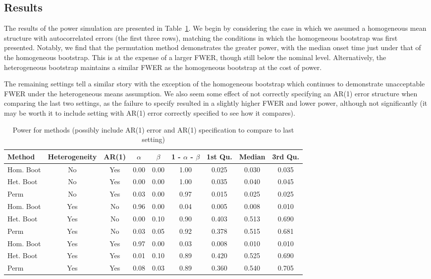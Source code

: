 \documentclass{article}
\begin{document}
\subsection{Results}

The results of the power simulation are presented in Table~\ref{tab:power_methods}. We begin by considering the case in which we assumed a homogeneous mean structure with autocorrelated errors (the first three rows), matching the conditions in which the homogeneous bootstrap was first presented. Notably, we find that the permutation method demonstrates the greater power, with the median onset time just under that of the homogeneous bootstrap. This is at the expense of a larger FWER, though still below the nominal level. Alternatively, the heterogeneous bootstrap maintains a similar FWER as the homogeneous bootstrap at the cost of power.

The remaining settings tell a similar story with the exception of the homogeneous bootstrap which continues to demonstrate unacceptable FWER under the heterogeneous means assumption. We also seem some effect of not correctly specifying an AR(1) error structure when comparing the last two settings, as the failure to specify resulted in a slightly higher FWER and lower power, although not significantly (it may be worth it to include setting with AR(1) error correctly specified to see how it compares). 


\begin{table}[H]
\centering
\begin{tabular}{lcccccccc}
  \hline
Method & Heterogeneity & AR(1) & $\alpha$ & $\beta$ & 1 - $\alpha$ - $\beta$ & 1st Qu. & Median & 3rd Qu. \\ 
  \hline
Hom. Boot & No & Yes & 0.00 & 0.00 & 1.00 & 0.025 & 0.030 & 0.035 \\ 
  Het. Boot & No & Yes & 0.00 & 0.00 & 1.00 & 0.035 & 0.040 & 0.045 \\ 
  Perm & No & Yes & 0.03 & 0.00 & 0.97 & 0.015 & 0.025 & 0.025 \\ 
  \hline
  Hom. Boot & Yes & No & 0.96 & 0.00 & 0.04 & 0.005 & 0.008 & 0.010 \\ 
  Het. Boot & Yes & No & 0.00 & 0.10 & 0.90 & 0.403 & 0.513 & 0.690 \\ 
  Perm & Yes & No & 0.03 & 0.05 & 0.92 & 0.378 & 0.515 & 0.681 \\ 
  \hline
  Hom. Boot & Yes & Yes & 0.97 & 0.00 & 0.03 & 0.008 & 0.010 & 0.010 \\ 
  Het. Boot & Yes & Yes & 0.01 & 0.10 & 0.89 & 0.420 & 0.525 & 0.690 \\ 
  Perm & Yes & Yes & 0.08 & 0.03 & 0.89 & 0.360 & 0.540 & 0.705 \\ 
   \hline
\end{tabular}
\caption{Power for methods (possibly include AR(1) error and AR(1) specification to compare to last setting)} 
\label{tab:power_methods}
\end{table}
\end{document}
